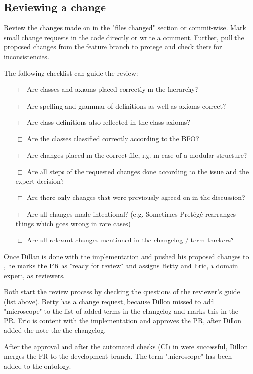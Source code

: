 \subsection{Reviewing a change}
Review the changes made on {\github} in the "files changed" section or commit-wise. Mark small change requests in the code directly or write a comment. Further, pull the proposed changes from the feature branch to protege and check there for inconsistencies. 

The following checklist can guide the review:
\begin{itemize}
    \item[$\Box$] Are classes and axioms placed correctly in the hierarchy?
    \item[$\Box$] Are spelling and grammar of definitions as well as axioms correct?
    \item[$\Box$] Are class definitions also reflected in the class axioms?
    \item[$\Box$] Are the classes classified correctly according to the BFO?
    \item[$\Box$] Are changes placed in the correct file, i.g. in case of a modular structure?
    \item[$\Box$] Are all steps of the requested changes done according to the issue and the expert decision?
    \item[$\Box$] Are there only changes that were previously agreed on in the discussion?
    \item[$\Box$] Are all changes made intentional? (e.g. Sometimes Protégé rearranges things which goes wrong in rare cases)
    \item[$\Box$] Are all relevant changes mentioned in the changelog / term trackers?
\end{itemize}
    
\begin{example}
Once Dillan is done with the implementation and pushed his proposed changes to {\github}, he marks the PR as "ready for review" and assigns Betty and Eric, a domain expert, as reviewers. 

Both start the review process by checking the questions of the reviewer's guide (list above). 
Betty has a change request, because Dillon missed to add "microscope" to the list of added terms in the changelog and marks this in the PR. Eric is content with the implementation and approves the PR, after Dillon added the note the the changelog.

After the approval and after the automated checks (CI) in {\github} were successful, Dillon merges the PR to the development branch. The term "microscope" has been added to the ontology.
\end{example}

